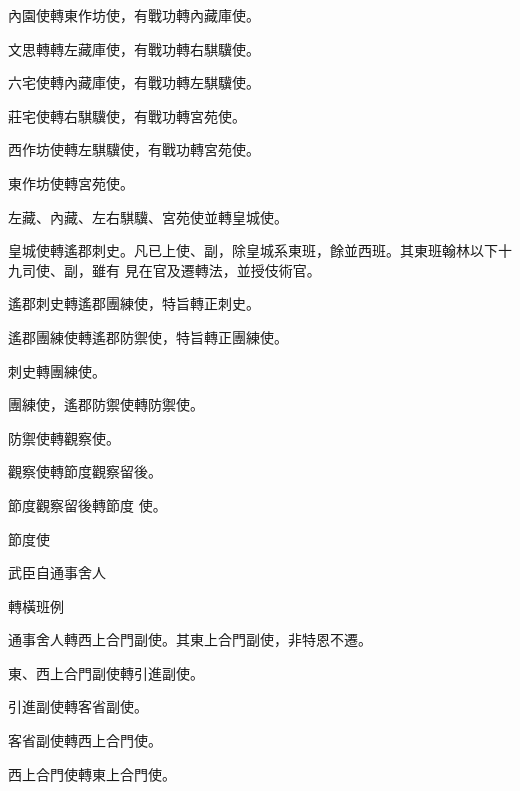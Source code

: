 \begin{pinyinscope}
 內園使轉東作坊使，有戰功轉內藏庫使。



 文思轉轉左藏庫使，有戰功轉右騏驥使。



 六宅使轉內藏庫使，有戰功轉左騏驥使。



 莊宅使轉右騏驥使，有戰功轉宮苑使。



 西作坊使轉左騏驥使，有戰功轉宮苑使。



 東作坊使轉宮苑使。



 左藏、內藏、左右騏驥、宮苑使並轉皇城使。



 皇城使轉遙郡刺史。凡已上使、副，除皇城系東班，餘並西班。其東班翰林以下十九司使、副，雖有
 見在官及遷轉法，並授伎術官。



 遙郡刺史轉遙郡團練使，特旨轉正刺史。



 遙郡團練使轉遙郡防禦使，特旨轉正團練使。



 刺史轉團練使。



 團練使，遙郡防禦使轉防禦使。



 防禦使轉觀察使。



 觀察使轉節度觀察留後。



 節度觀察留後轉節度
 使。



 節度使



 武臣自通事舍人



 轉橫班例



 通事舍人轉西上合門副使。其東上合門副使，非特恩不遷。



 東、西上合門副使轉引進副使。



 引進副使轉客省副使。



 客省副使轉西上合門使。



 西上合門使轉東上合門使。




\end{pinyinscope}
